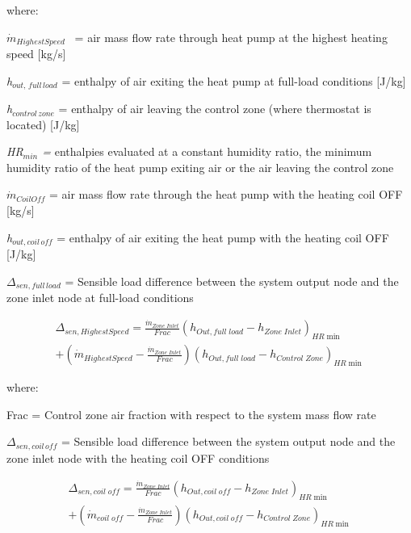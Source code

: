 where:

\emph{\({\dot m}_{HighestSpeed}\)}~ = air mass flow rate through heat pump at the highest heating speed {[}kg/s{]}

\emph{h\(_{out,\, full\, load}\)} = enthalpy of air exiting the heat pump at full-load conditions {[}J/kg{]}

\emph{h\(_{control \, zone}\)} = enthalpy of air leaving the control zone (where thermostat is located) {[}J/kg{]}

\emph{HR\(_{min}\) =} enthalpies evaluated at a constant humidity ratio, the minimum humidity ratio of the heat pump exiting air or the air leaving the control zone

\({\dot m}_{CoilOff}\) = air mass flow rate through the heat pump with the heating coil OFF {[}kg/s{]}

\emph{h\(_{out,coil \, off}\)} = enthalpy of air exiting the heat pump with the heating coil OFF {[}J/kg{]}

\(\Delta_{sen,full\, load}\) = Sensible load difference between the system output node and the zone inlet node at full-load conditions

\begin{equation}
\begin{split}
{\Delta_{sen,HighestSpeed}} = \frac{{{{\dot m}_{Zone\;Inlet}}}}{{Frac}}{\left( {{h_{Out,full\;load}} - {h_{Zone\;Inlet}}} \right)_{HR\min }} \\
+ \left( {{{\dot m}_{HighestSpeed}} - \frac{{{{\dot m}_{Zone\;Inlet}}}}{{Frac}}} \right){\left( {h_{Out,full\;load} - {h_{Control\;Zone}}} \right)_{HR\min }}
\end{split}
\end{equation}

where:

Frac = Control zone air fraction with respect to the system mass flow rate

\(\Delta_{sen,coil\, off}\) = Sensible load difference between the system output node and the zone inlet node with the heating coil OFF conditions

\begin{equation}
\begin{split}
{\Delta_{sen,coil\;off}} = \frac{{{{\dot m}_{Zone\;Inlet}}}}{{Frac}}{\left( {{h_{Out,coil\;off}} - {h_{Zone\;Inlet}}} \right)_{HR\min }} \\
+ \left( {{{\dot m}_{coil\;off}} - \frac{{{{\dot m}_{Zone\;Inlet}}}}{{Frac}}} \right){\left( {{h_{Out,coil\;off}} - {h_{Control\;Zone}}} \right)_{HR\min }}
\end{split}
\end{equation}

